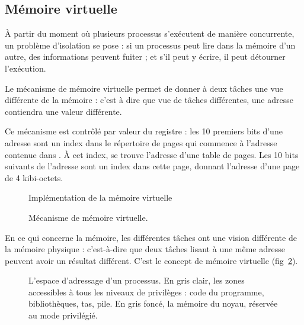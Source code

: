 \subsection{Mémoire virtuelle}

À partir du moment où plusieurs processus s'exécutent de manière concurrente, un
problème d'isolation se pose : si un processus peut lire dans la mémoire d'un
autre, des informations peuvent fuiter ; et s'il peut y écrire, il peut
détourner l'exécution.


Le mécanisme de mémoire virtuelle permet de donner à deux tâches une vue
différente de la mémoire : c'est à dire que vue de tâches différentes, une
adresse contiendra une valeur différente.

Ce mécanisme est contrôlé par valeur du registre \crtrois : les 10 premiers bits
d'une adresse sont un index dans le répertoire de pages qui commence à l'adresse contenue dans
\crtrois. À cet index, se trouve l'adresse d'une table de pages. Les 10 bits
suivants de l'adresse sont un index dans cette page, donnant l'adresse d'une
page de 4 kibi-octets.

\begin{figure}

\caption{Implémentation de la mémoire virtuelle}
\label{fig:pagetables}
\end{figure}

\begin{figure} %
\centering
{}
\caption{Mécanisme de mémoire virtuelle.}
\label{fig:memoire-virtuelle}
\end{figure} %

En ce qui concerne la mémoire, les différentes tâches ont une vision différente
de la mémoire physique : c'est-à-dire que deux tâches lisant à une même adresse
peuvent avoir un résultat différent. C'est le concept de mémoire virtuelle
(fig~\ref{fig:memoire-virtuelle}).

\begin{figure} %
\centering
\fbox{
  
}

\caption[Espace d'adressage d'un processus]{L'espace d'adressage d'un processus.
En gris clair, les zones accessibles à tous les niveaux de privilèges : code du
programme, bibliothèques, tas, pile. En gris foncé, la mémoire du noyau,
réservée au mode privilégié.}

\label{fig:memmap}
\end{figure}

